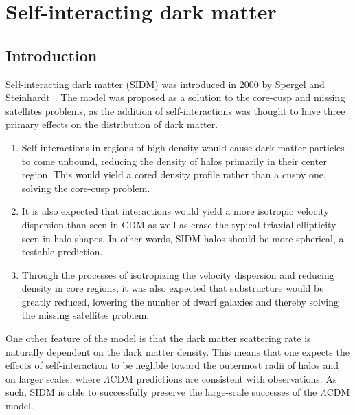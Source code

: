\hypertarget{self-interacting-dark-matter}{%
\chapter{Self-interacting dark
matter}\label{self-interacting-dark-matter}}

\hypertarget{introduction}{%
\section{Introduction}\label{introduction}}

Self-interacting dark matter (SIDM) was introduced in 2000 by Spergel
and Steinhardt~\cite{spergel_observational_2000}. The model was proposed as
a solution to the core-cusp and missing satellites problems, as the
addition of self-interactions was thought to have three primary effects
on the distribution of dark matter. 

\begin{enumerate}
    \item Self-interactions in regions of high density would cause dark matter
    particles to come unbound, reducing the density of halos primarily in
    their center region.  This would yield a cored density profile rather than
    a cuspy one, solving the core-cusp problem.

    \item It is also expected that interactions would yield a more isotropic
    velocity dispersion than seen in CDM as well as erase the typical triaxial
    ellipticity seen in halo shapes. In other words, SIDM halos should be more
    spherical, a testable prediction.

    \item Through the processes of isotropizing the velocity dispersion and
    reducing density in core regions, it was also expected that substructure
    would be greatly reduced, lowering the number of dwarf galaxies and
    thereby solving the missing satellites problem.
\end{enumerate}

One other feature of the model is that the dark matter scattering rate is
naturally dependent on the dark matter density. This means that one expects the
effects of self-interaction to be neglible toward the outermost radii of halos
and on larger scales, where $\Lambda$CDM predictions are consistent with
observations. As such, SIDM is able to successfully preserve the large-scale
successes of the $\Lambda$CDM model.

